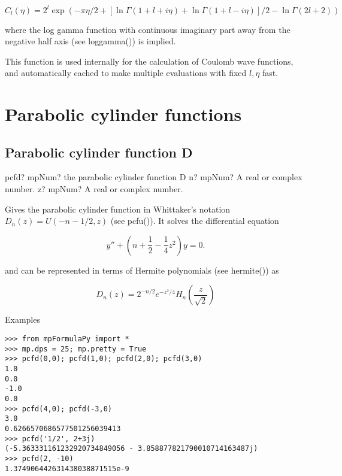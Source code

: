 \begin{equation}
C_l(\eta)=2^l \exp(-\pi\eta/2 + [\ln\Gamma(1+l+i\eta) + \ln\Gamma(1+l-i\eta)]/2 - \ln\Gamma(2l+2))
\end{equation}

where the log gamma function with continuous imaginary part away from the negative half axis (see loggamma()) is implied.

\vpara
This function is used internally for the calculation of Coulomb wave functions, and automatically cached to make multiple evaluations with fixed $l,\eta$ fast.





\newpage
\section{Parabolic cylinder functions}

\subsection{Parabolic cylinder function D}

\begin{mpFunctionsExtract}
	\mpFunctionTwo
	{pcfd? mpNum? the parabolic cylinder function D}
	{n? mpNum? A real or complex number.}
	{z? mpNum? A real or complex number.}	
\end{mpFunctionsExtract}


\vpara
Gives the parabolic cylinder function in Whittaker's notation $D_n(z)=U(-n-1/2, z)$ (see pcfu()). It solves the differential equation 

\begin{equation}
y'' + \left(n+\frac{1}{2} - \frac{1}{4} z^2\right) y = 0.
\end{equation}

and can be represented in terms of Hermite polynomials (see hermite()) as

\begin{equation}
D_n(z) = 2^{-n/2} e^{-z^2/4} H_n\left(\frac{z}{\sqrt{2}}  \right)
\end{equation}

Examples


\begin{lstlisting}
>>> from mpFormulaPy import *
>>> mp.dps = 25; mp.pretty = True
>>> pcfd(0,0); pcfd(1,0); pcfd(2,0); pcfd(3,0)
1.0
0.0
-1.0
0.0
>>> pcfd(4,0); pcfd(-3,0)
3.0
0.6266570686577501256039413
>>> pcfd('1/2', 2+3j)
(-5.363331161232920734849056 - 3.858877821790010714163487j)
>>> pcfd(2, -10)
1.374906442631438038871515e-9
\end{lstlisting}




